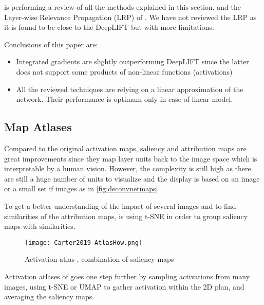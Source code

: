 \cite{Ancona2018} is performing a review of all the methods explained in this section, and the Layer-wise Relevance Propagation (LRP) of \cite{Bach2015}. We have not reviewed the LRP as it is found to be close to the DeepLIFT but with more limitations.

Conclusions of this paper are:
\begin{itemize}
    \item Integrated gradients are slightly outperforming DeepLIFT since the latter does not support some products of non-linear functions (activations)
    \item All the reviewed techniques are relying on a linear approximation of the network. Their performance is optimum only in case of linear model.
\end{itemize}


\subsection{Map Atlases}

Compared to the original activation maps, saliency and attribution maps are great improvements since they map layer units back to the image space which is interpretable by a human vision. However, the complexity is still high as there are still a huge number of units to visualize and the display is based on an image or a small set if images as in \ref{fig:deconvnetmaps}.

To get a better understanding of the impact of several images and to find similarities of the attribution maps, \cite{Nguyen2016} is using t-SNE in order to group saliency maps with similarities.

\begin{figure}[H]
    \texttt{[image: Carter2019-AtlasHow.png]}
    \caption{Activation atlas \cite{Carter2019}, combination of saliency maps}
    \label{fig:atlas-how}
    \centering
\end{figure}

Activation atlases of \cite{Carter2019} goes one step further by sampling activations from many images, using t-SNE or UMAP to gather activation within the 2D plan, and averaging the saliency maps.



